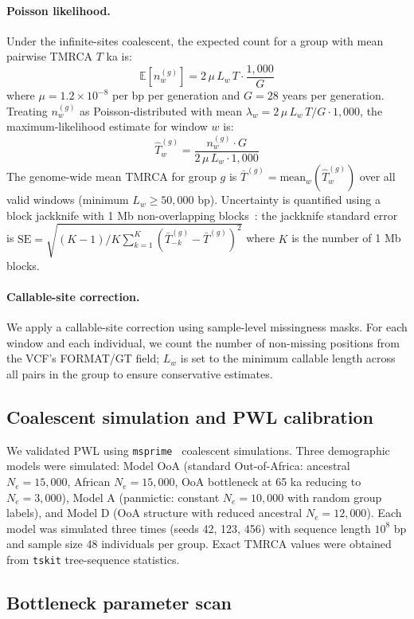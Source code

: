 \paragraph{Poisson likelihood.}
Under the infinite-sites coalescent, the expected count for a group with mean pairwise TMRCA $T$ ka is:
\[
\mathbb{E}[n_w^{(g)}] = 2\,\mu\,L_w\,T \cdot \frac{1{,}000}{G}
\]
where $\mu = 1.2 \times 10^{-8}$ per bp per generation and $G = 28$ years per generation. Treating $n_w^{(g)}$ as Poisson-distributed with mean $\lambda_w = 2\,\mu\,L_w\,T / G \cdot 1{,}000$, the maximum-likelihood estimate for window $w$ is:
\[
\hat{T}_w^{(g)} = \frac{n_w^{(g)} \cdot G}{2\,\mu\,L_w \cdot 1{,}000}
\]
The genome-wide mean TMRCA for group $g$ is $\bar{T}^{(g)} = \text{mean}_w(\hat{T}_w^{(g)})$ over all valid windows (minimum $L_w \geq 50{,}000$ bp). Uncertainty is quantified using a block jackknife with 1 Mb non-overlapping blocks~\citep{Kunsch1989}: the jackknife standard error is $\text{SE} = \sqrt{(K-1)/K \sum_{k=1}^K (\bar{T}^{(g)}_{-k} - \bar{T}^{(g)})^2}$ where $K$ is the number of 1 Mb blocks.

\paragraph{Callable-site correction.}
We apply a callable-site correction using sample-level missingness masks. For each window and each individual, we count the number of non-missing positions from the VCF's FORMAT/GT field; $L_w$ is set to the minimum callable length across all pairs in the group to ensure conservative estimates.

\subsection*{Coalescent simulation and PWL calibration}

We validated PWL using \texttt{msprime}~\citep{Kelleher2016} coalescent simulations. Three demographic models were simulated: Model OoA (standard Out-of-Africa: ancestral $N_e = 15{,}000$, African $N_e = 15{,}000$, OoA bottleneck at 65 ka reducing to $N_e = 3{,}000$), Model A (panmictic: constant $N_e = 10{,}000$ with random group labels), and Model D (OoA structure with reduced ancestral $N_e = 12{,}000$). Each model was simulated three times (seeds 42, 123, 456) with sequence length $10^8$ bp and sample size 48 individuals per group. Exact TMRCA values were obtained from \texttt{tskit} tree-sequence statistics.

\subsection*{Bottleneck parameter scan}


